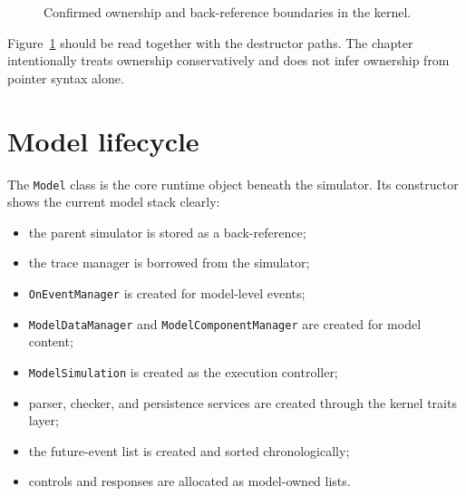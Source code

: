 \begin{figure}[htbp]
\centering
\caption{Confirmed ownership and back-reference boundaries in the kernel.}
\label{fig:kernel-ownership}
\end{figure}

Figure~\ref{fig:kernel-ownership} should be read together with the destructor
paths. The chapter intentionally treats ownership conservatively and does not
infer ownership from pointer syntax alone.

\section{Model lifecycle}
\label{sec:model-lifecycle}

The \texttt{Model} class is the core runtime object beneath the simulator.
Its constructor shows the current model stack clearly:
\begin{itemize}
\item the parent simulator is stored as a back-reference;
\item the trace manager is borrowed from the simulator;
\item \texttt{OnEventManager} is created for model-level events;
\item \texttt{ModelDataManager} and \texttt{ModelComponentManager} are created
for model content;
\item \texttt{ModelSimulation} is created as the execution controller;
\item parser, checker, and persistence services are created through the kernel
traits layer;
\item the future-event list is created and sorted chronologically;
\item controls and responses are allocated as model-owned lists.
\end{itemize}

